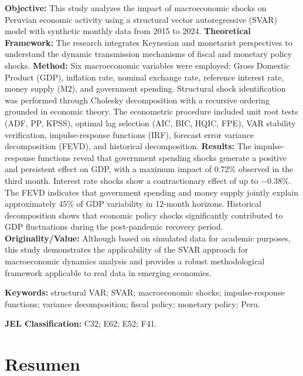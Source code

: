 \documentclass[12pt, a4paper]{article}
\begin{document}
\textbf{Objective:} This study analyzes the impact of macroeconomic shocks on Peruvian economic activity using a structural vector autoregressive (SVAR) model with synthetic monthly data from 2015 to 2024. \textbf{Theoretical Framework:} The research integrates Keynesian and monetarist perspectives to understand the dynamic transmission mechanisms of fiscal and monetary policy shocks. \textbf{Method:} Six macroeconomic variables were employed: Gross Domestic Product (GDP), inflation rate, nominal exchange rate, reference interest rate, money supply (M2), and government spending. Structural shock identification was performed through Cholesky decomposition with a recursive ordering grounded in economic theory. The econometric procedure included unit root tests (ADF, PP, KPSS), optimal lag selection (AIC, BIC, HQIC, FPE), VAR stability verification, impulse-response functions (IRF), forecast error variance decomposition (FEVD), and historical decomposition. \textbf{Results:} The impulse-response functions reveal that government spending shocks generate a positive and persistent effect on GDP, with a maximum impact of 0.72\% observed in the third month. Interest rate shocks show a contractionary effect of up to $-0.38\%$. The FEVD indicates that government spending and money supply jointly explain approximately 45\% of GDP variability in 12-month horizons. Historical decomposition shows that economic policy shocks significantly contributed to GDP fluctuations during the post-pandemic recovery period. \textbf{Originality/Value:} Although based on simulated data for academic purposes, this study demonstrates the applicability of the SVAR approach for macroeconomic dynamics analysis and provides a robust methodological framework applicable to real data in emerging economies.

\bigskip
\noindent\textbf{Keywords:} structural VAR; SVAR; macroeconomic shocks; impulse-response functions; variance decomposition; fiscal policy; monetary policy; Peru.

\noindent\textbf{JEL Classification:} C32; E62; E52; F41.

\section*{Resumen}
\end{document}

